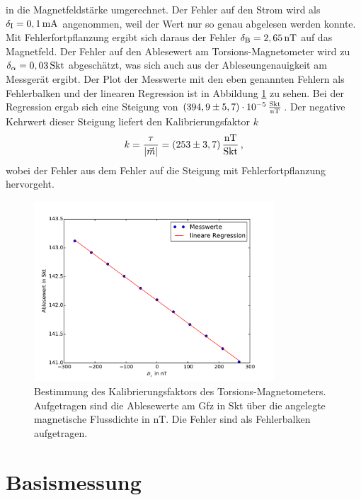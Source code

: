 in die Magnetfeldstärke umgerechnet. Der Fehler auf den Strom wird als $\delta_{\mathrm{I}}=0,1\,\mathrm{mA}$ angenommen, weil der Wert nur so genau abgelesen werden konnte. Mit Fehlerfortpflanzung ergibt sich daraus der Fehler $\delta_{\mathrm{B}}=2,65\,\mathrm{nT}$ auf das Magnetfeld. Der Fehler auf den Ablesewert am Torsions-Magnetometer wird zu $\delta_{\mathrm{\alpha}}=0,03\,\mathrm{Skt}$ abgeschätzt, was sich auch aus der Ableseungenauigkeit am Messgerät ergibt. Der Plot der Messwerte mit den eben genannten Fehlern als Fehlerbalken und der linearen Regression ist in Abbildung \ref{fig:kalibrierung} zu sehen. Bei der Regression ergab sich eine Steigung von $(394,9\pm5,7)\cdot 10^{-5}\,\frac{\mathrm{Skt}}{\mathrm{nT}}$. Der negative Kehrwert dieser Steigung liefert den Kalibrierungsfaktor $k$
\begin{equation}
 k=\frac{\tau}{|\vec{m}|}=(253\pm3,7)\,\frac{\mathrm{nT}}{\mathrm{Skt}} \text{\,,}
\end{equation}
wobei der Fehler aus dem Fehler auf die Steigung mit Fehlerfortpflanzung hervorgeht.

\begin{figure}[!ht]
 \centering
 \includegraphics[width=0.8\textwidth]{fig/kalibrierung}
 \caption[Bestimmung des Kalibrierungsfaktors des Torsions-Magnetometers]{Bestimmung des Kalibrierungsfaktors des Torsions-Magnetometers. Aufgetragen sind die Ablesewerte am Gfz in Skt über die angelegte magnetische Flussdichte in nT. Die Fehler sind als Fehlerbalken aufgetragen.}
 \label{fig:kalibrierung}
\end{figure}

\section{Basismessung}

